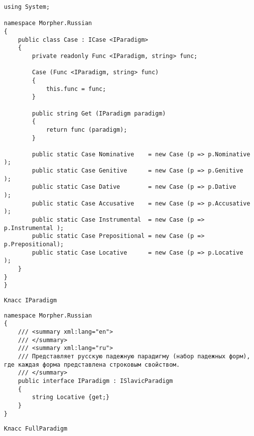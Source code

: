\begin{lstlisting}
using System;

namespace Morpher.Russian
{
    public class Case : ICase <IParadigm>
    {
        private readonly Func <IParadigm, string> func;

        Case (Func <IParadigm, string> func)
        {
            this.func = func;
        }

        public string Get (IParadigm paradigm)
        {
            return func (paradigm);
        }

        public static Case Nominative    = new Case (p => p.Nominative   );
        public static Case Genitive      = new Case (p => p.Genitive     );
        public static Case Dative        = new Case (p => p.Dative       );
        public static Case Accusative    = new Case (p => p.Accusative   );
        public static Case Instrumental  = new Case (p => p.Instrumental );
        public static Case Prepositional = new Case (p => p.Prepositional);
        public static Case Locative      = new Case (p => p.Locative     );
    }
}
}
\end{lstlisting}

\begin{verbatim}
Класс IParadigm
\end{verbatim}

\begin{lstlisting}
namespace Morpher.Russian
{
    /// <summary xml:lang="en">
    /// </summary>
    /// <summary xml:lang="ru">
    /// Представляет русскую падежную парадигму (набор падежных форм), где каждая форма представлена строковым свойством.
    /// </summary>
    public interface IParadigm : ISlavicParadigm
    {
        string Locative {get;}
    }
}
\end{lstlisting}

\begin{verbatim}
Класс FullParadigm
\end{verbatim}


